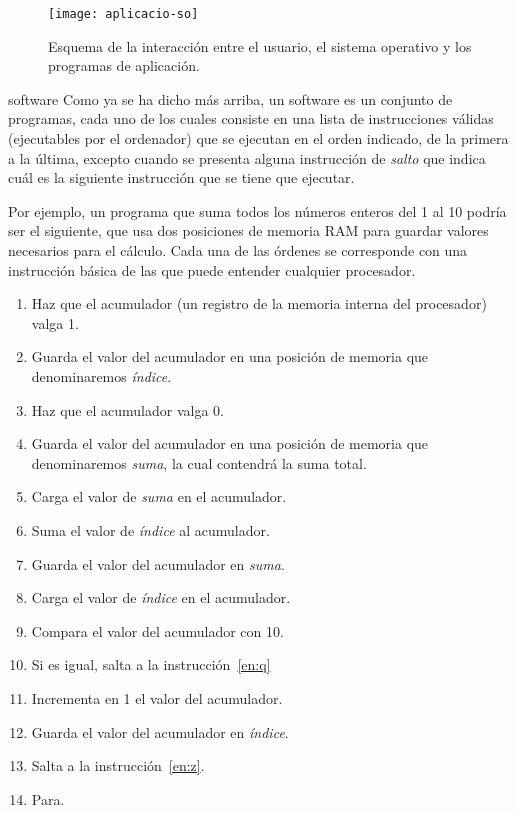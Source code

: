 \begin{figure} \centering

\texttt{[image: aplicacio-so]} \caption{Esquema de la interacción entre el usuario, el sistema operativo y los programas de aplicación.} \label{fg:aplicacio-so} \end{figure} 

\begin{persabermes}{software} Como ya se ha dicho más arriba, un software es un conjunto de programas, cada uno de los cuales consiste en una lista de instrucciones válidas (ejecutables por el ordenador) que se ejecutan en el orden indicado, de la primera a la última, excepto cuando se presenta alguna instrucción de \emph{salto} que indica cuál es la siguiente instrucción que se tiene que ejecutar. 

Por ejemplo, un programa que suma todos los números enteros del 1 al 10 podría ser el siguiente, que usa dos posiciones de memoria RAM para guardar valores necesarios para el cálculo. Cada una de las órdenes se corresponde con una instrucción básica de las que puede entender cualquier procesador. \begin{enumerate} \item Haz que el acumulador (un registro de la memoria interna del procesador) valga 1. \item Guarda el valor del acumulador en una posición de memoria que denominaremos \emph{índice}. \item Haz que el acumulador valga 0. \item Guarda el valor del acumulador en una posición de memoria que denominaremos \emph{suma}, la cual contendrá la suma total. \item \label{en:z} Carga el valor de \emph{suma} en el acumulador. \item Suma el valor de \emph{índice} al acumulador. \item Guarda el valor del acumulador en \emph{suma}. \item Carga el valor de \emph{índice} en el acumulador. \item Compara el valor del acumulador con 10. \item Si es igual, salta a la instrucción~\ref{en:q} \item Incrementa en 1 el valor del acumulador. \item Guarda el valor del acumulador en \emph{índice}. \item Salta a la instrucción~\ref{en:z}. \item \label{en:q} Para. \end{enumerate} 


\end{persabermes}
